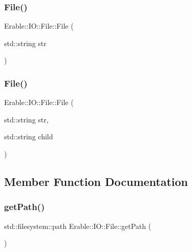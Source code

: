 \subsubsection{\texorpdfstring{File()}{File()}\hspace{0.1cm}{\footnotesize\ttfamily [1/2]}}
{\footnotesize\ttfamily Erable\+::\+I\+O\+::\+File\+::\+File (\begin{DoxyParamCaption}\item[{std\+::string}]{str }\end{DoxyParamCaption})\hspace{0.3cm}{\ttfamily [inline]}}

\mbox{\label{class_erable_1_1_i_o_1_1_file_a1032497e721249b1cacfce0daf8d6cac}} 
\subsubsection{\texorpdfstring{File()}{File()}\hspace{0.1cm}{\footnotesize\ttfamily [2/2]}}
{\footnotesize\ttfamily Erable\+::\+I\+O\+::\+File\+::\+File (\begin{DoxyParamCaption}\item[{std\+::string}]{str,  }\item[{std\+::string}]{child }\end{DoxyParamCaption})\hspace{0.3cm}{\ttfamily [inline]}}



\subsection{Member Function Documentation}
\mbox{\label{class_erable_1_1_i_o_1_1_file_a255ebefb8041926d528beb0436838363}} 
\subsubsection{\texorpdfstring{getPath()}{getPath()}}
{\footnotesize\ttfamily std\+::filesystem\+::path Erable\+::\+I\+O\+::\+File\+::get\+Path (\begin{DoxyParamCaption}{ }\end{DoxyParamCaption})\hspace{0.3cm}{\ttfamily [inline]}}

